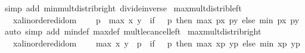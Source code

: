 \begin{isabellebody}
%
\isadelimproof
%
\endisadelimproof
%
\isatagproof
{}\isamarkupfalse%
\ {\isacharparenleft}{\kern0pt}simp\ add{\isacharcolon}{\kern0pt}\ min{\isacharunderscore}{\kern0pt}mult{\isacharunderscore}{\kern0pt}distrib{\isacharunderscore}{\kern0pt}right\ divide{\isacharunderscore}{\kern0pt}inverse{\isacharparenright}{\kern0pt}%
\endisatagproof
{\isafoldproof}%
%
\isadelimproof
\isanewline
%
\endisadelimproof
\isanewline
{}\isamarkupfalse%
\ max{\isacharunderscore}{\kern0pt}mult{\isacharunderscore}{\kern0pt}distrib{\isacharunderscore}{\kern0pt}left{\isacharcolon}{\kern0pt}\isanewline
\ \ \ x{\isacharcolon}{\kern0pt}{\isacharcolon}{\kern0pt}{\isachardoublequoteopen}{\isacharprime}{\kern0pt}a{\isacharcolon}{\kern0pt}{\isacharcolon}{\kern0pt}linordered{\isacharunderscore}{\kern0pt}idom{\isachardoublequoteclose}\ \isanewline
\ \ \ {\isachardoublequoteopen}p\ {\isacharasterisk}{\kern0pt}\ max\ x\ y\ {\isacharequal}{\kern0pt}\ {\isacharparenleft}{\kern0pt}if\ {}\ {\isasymle}\ p\ then\ max\ {\isacharparenleft}{\kern0pt}p{\isacharasterisk}{\kern0pt}x{\isacharparenright}{\kern0pt}\ {\isacharparenleft}{\kern0pt}p{\isacharasterisk}{\kern0pt}y{\isacharparenright}{\kern0pt}\ else\ min\ {\isacharparenleft}{\kern0pt}p{\isacharasterisk}{\kern0pt}x{\isacharparenright}{\kern0pt}\ {\isacharparenleft}{\kern0pt}p{\isacharasterisk}{\kern0pt}y{\isacharparenright}{\kern0pt}{\isacharparenright}{\kern0pt}{\isachardoublequoteclose}\isanewline
%
\isadelimproof
%
\endisadelimproof
%
\isatagproof
{}\isamarkupfalse%
\ {\isacharparenleft}{\kern0pt}auto\ simp\ add{\isacharcolon}{\kern0pt}\ min{\isacharunderscore}{\kern0pt}def\ max{\isacharunderscore}{\kern0pt}def\ mult{\isacharunderscore}{\kern0pt}le{\isacharunderscore}{\kern0pt}cancel{\isacharunderscore}{\kern0pt}left{\isacharparenright}{\kern0pt}%
\endisatagproof
{\isafoldproof}%
%
\isadelimproof
\isanewline
%
\endisadelimproof
\isanewline
{}\isamarkupfalse%
\ max{\isacharunderscore}{\kern0pt}mult{\isacharunderscore}{\kern0pt}distrib{\isacharunderscore}{\kern0pt}right{\isacharcolon}{\kern0pt}\isanewline
\ \ \ x{\isacharcolon}{\kern0pt}{\isacharcolon}{\kern0pt}{\isachardoublequoteopen}{\isacharprime}{\kern0pt}a{\isacharcolon}{\kern0pt}{\isacharcolon}{\kern0pt}linordered{\isacharunderscore}{\kern0pt}idom{\isachardoublequoteclose}\ \isanewline
\ \ \ {\isachardoublequoteopen}max\ x\ y\ {\isacharasterisk}{\kern0pt}\ p\ {\isacharequal}{\kern0pt}\ {\isacharparenleft}{\kern0pt}if\ {}\ {\isasymle}\ p\ then\ max\ {\isacharparenleft}{\kern0pt}x{\isacharasterisk}{\kern0pt}p{\isacharparenright}{\kern0pt}\ {\isacharparenleft}{\kern0pt}y{\isacharasterisk}{\kern0pt}p{\isacharparenright}{\kern0pt}\ else\ min\ {\isacharparenleft}{\kern0pt}x{\isacharasterisk}{\kern0pt}p{\isacharparenright}{\kern0pt}\ {\isacharparenleft}{\kern0pt}y{\isacharasterisk}{\kern0pt}p{\isacharparenright}{\kern0pt}{\isacharparenright}{\kern0pt}{\isachardoublequoteclose}\isanewline

\end{isabellebody}
